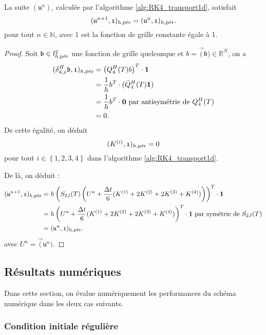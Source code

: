 \begin{proposition}
La suite $(\mathfrak{u}^n)$, calculée par l'algorithme \ref{alg:RK4_transport1d}, satisfait
\begin{equation}
(\mathfrak{u}^{n+1}, \mathfrak{1})_{h,\per} = (\mathfrak{u}^n, \mathfrak{1})_{h,\per}.
\end{equation}
pour tout $n \in \mathbb{N}$, avec $\mathfrak{1}$ est la fonction de grille constante égale à 1.
\end{proposition}

\begin{proof}
Soit $\mathfrak{b} \in l^2_{h,\per}$ une fonction de grille quelconque et $b=\vec(\mathfrak{b}) \in \mathbb{R}^N$, on a
\begin{align*}
(\delta_{4,x}^H \mathfrak{b}, \mathfrak{1})_{h,\per} & = \left( Q_4^H(T) b \right)^T \cdot \mathbf{1} \\
	& = \dfrac{1}{h} b^T \cdot (\bar{Q}_4^H(T) \mathbf{1}) \\
	& = \dfrac{1}{h} b^T \cdot \mathbf{0} \text{ par antisymétrie de }Q_4^H(T)\\
	& = 0.
\end{align*}
De cette égalité, on déduit
\begin{equation}
(K^{(i)}, \mathfrak{1})_{h,\per} = 0
\end{equation}
pour tout $i \in \left\lbrace 1, 2, 3, 4 \right\rbrace$ dans l'algorithme \ref{alg:RK4_transport1d}.

De là, on déduit :
\begin{align*}
(\mathfrak{u}^{n+1},\mathfrak{1})_{h,\per} & = h \left( S_{2J}(T) \left( U^n + \dfrac{\Delta t}{6}(K^{(1)}+2K^{(2)}+2K^{(3)}+K^{(4)})  \right) \right)^T \cdot \mathbf{1} \\
	& = h \left( U^n + \dfrac{\Delta t}{6}(K^{(1)}+2K^{(2)}+2K^{(3)}+K^{(4)})  \right)^T \cdot \mathbf{1} \text{ par symétrie de } S_{2J}(T)\\
	& = (\mathfrak{u}^n , \mathfrak{1})_{h,\per}.
\end{align*}
avec $U^n = \vec(\mathfrak{u}^n)$.
\end{proof}

\subsection{Résultats numériques}

Dans cette section, on évalue numériquement les performances du schéma numérique dans les deux cas suivants.

\subsubsection{Condition initiale régulière}

